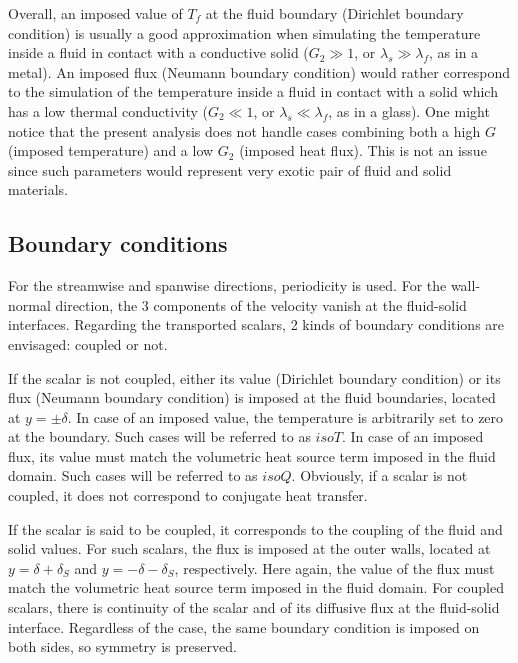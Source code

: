 \documentclass{svjour3}                     %
\begin{document}
Overall, an imposed value of $T_f$ at the fluid boundary (Dirichlet boundary condition) is usually a good approximation when simulating the temperature inside a fluid in contact with a conductive solid ($G_2 \gg 1$, or $\lambda_s \gg \lambda_f$, as in a metal).
An imposed flux (Neumann boundary condition) would rather correspond to the simulation of the temperature inside a fluid in contact with a solid which has a low thermal conductivity ($G_2 \ll 1$, or $\lambda_s \ll \lambda_f$, as in a glass).
One might notice that the present analysis does not handle cases combining both a high $G$ (imposed temperature) and a low $G_2$ (imposed heat flux).
This is not an issue since such parameters would represent very exotic pair of fluid and solid materials.


\subsection{Boundary conditions}
\label{subsec-cond_lim}

For the streamwise and spanwise directions, periodicity is used.
For the wall-normal direction, the 3 components of the velocity vanish at the fluid-solid interfaces.
Regarding the transported scalars, 2 kinds of boundary conditions are envisaged: coupled or not.

If the scalar is not coupled, either its value (Dirichlet boundary condition) or its flux (Neumann boundary condition) is imposed at the fluid boundaries, located at ${y= \pm \delta}$.
In case of an imposed value, the temperature is arbitrarily set to zero at the boundary.
Such cases will be referred to as $isoT$.
In case of an imposed flux, its value must match the volumetric heat source term imposed in the fluid domain.
Such cases will be referred to as $isoQ$.
Obviously, if a scalar is not coupled, it does not correspond to conjugate heat transfer.

If the scalar is said to be coupled, it corresponds to the coupling of the fluid and solid values.
For such scalars, the flux is imposed at the outer walls, located at ${y = \delta + \delta_S}$ and ${y = - \delta - \delta_S}$, respectively.
Here again, the value of the flux must match the volumetric heat source term imposed in the fluid domain.
For coupled scalars, there is continuity of the scalar and of its diffusive flux at the fluid-solid interface.
Regardless of the case, the same boundary condition is imposed on both sides, so symmetry is preserved.
\end{document}
